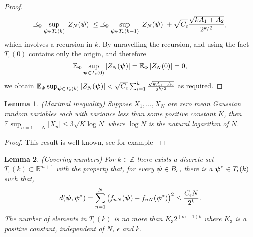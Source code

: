 \documentclass[aap]{imsart}
\newcommand{\reals}{{\mathbb R}}
\newcommand{\ints}{{\mathbb Z}}
\newcommand{\expect}{{\mathbb E}}
\newcommand{\abs}[1]{\left\vert #1 \right\vert}
\newcommand{\sabs}[1]{\vert #1 \vert}
\newtheorem{lemma}{Lemma}
\begin{document}
\begin{proof}
\begin{align*}
\expect_{\Phi} \sup_{\psibf \in T_\epsilon(k) } \sabs{ Z_N(\psibf) } \leq \expect_{\Phi} \sup_{\psibf \in T_\epsilon(k-1)} \sabs{ Z_N(\psibf) }  + \sqrt{C_\epsilon}\frac{\sqrt{  k A_1 + A_2 }}{2^{k/2}},
\end{align*}
which involves a recursion in $k$.  By unravelling the recursion, and using the fact $T_\epsilon(0)$ contains only the origin, and therefore 
\[
\expect_{\Phi}\sup_{\psibf \in T_\epsilon(0)} \abs{ Z_N(\psibf) } = \expect_{\Phi}\abs{ Z_N(0) } = 0,
\]
we obtain $\expect_{\Phi} \sup_{\psibf \in T_\epsilon(k) } \abs{ Z_N(\psibf) } < \sqrt{C_\epsilon} \sum_{i=1}^{k}\frac{\sqrt{  k A_1 + A_2 }}{2^{k/2}}$
as required.
\end{proof}

\begin{lemma}\label{lem:maxineq}(Maximal inequality)
Suppose $X_1, \dots, X_N$ are zero mean Gaussian random variables each with variance less than some positive constant $K$, then $\expect \sup_{n = 1, \dots, N} \abs{X_n} \leq 3  \sqrt{K \log N}$ where $\log N$ is the natural logarithm of $N$.
\end{lemma}
\begin{proof}
This result is well known, see for example~\cite[Section 3]{Pollard_asymp_empi_proc_1989}  
\end{proof}


\begin{lemma}\label{lem:metricentropy} (Covering numbers)
For $k \in \ints$ there exists a discrete set $T_\epsilon(k) \subset \reals^{m+1}$ with the property that, for every $\boldsymbol{\psi} \in B_\epsilon$, there is a $\boldsymbol{\psi}^* \in T_\epsilon(k)$ such that,
\[
d(\boldsymbol{\psi},\boldsymbol{\psi}^*) = \sum_{n = 1}^N \big( f_{nN}(\boldsymbol{\psi}) - f_{nN}(\boldsymbol{\psi}^*) \big)^2 \leq \frac{C_\epsilon N}{2^k}.
\]
The number of elements in $T_\epsilon(k)$ is no more than $K_3 2^{(m+1)k}$ where $K_3$ is a positive constant, independent of $N$, $\epsilon$ and $k$.
\end{lemma}
\end{document}
